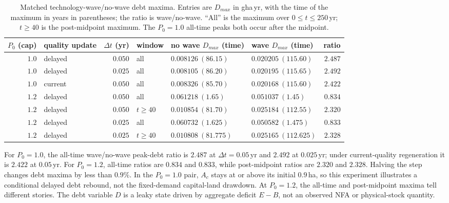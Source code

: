 \documentclass[11pt,a4paper]{article}
\begin{document}
\begin{table}[htbp]
\centering\small
\caption{Matched technology-wave/no-wave debt maxima. Entries are $D_{max}$ in gha\,yr, with the time of the maximum in years in parentheses; the ratio is wave/no-wave. ``All'' is the maximum over $0\le t\le250$\,yr; $t\ge40$ is the post-midpoint maximum. The $P_0=1.0$ all-time peaks both occur after the midpoint.}
\label{tab:si_wave_debt}
\begin{tabularx}{\textwidth}{r l r l >{\centering\arraybackslash}X >{\centering\arraybackslash}X r}
\toprule
$P_0$ (cap) & quality update & $\Delta t$ (yr) & window & no wave $D_{max}$ (time) & wave $D_{max}$ (time) & ratio \\
\midrule
$1.0$ & delayed & $0.050$ & all & $0.008126\ (86.15)$ & $0.020205\ (115.60)$ & $2.487$ \\
$1.0$ & delayed & $0.025$ & all & $0.008105\ (86.20)$ & $0.020195\ (115.65)$ & $2.492$ \\
$1.0$ & current & $0.050$ & all & $0.008326\ (85.70)$ & $0.020168\ (115.60)$ & $2.422$ \\
$1.2$ & delayed & $0.050$ & all & $0.061218\ (1.65)$ & $0.051037\ (1.45)$ & $0.834$ \\
$1.2$ & delayed & $0.050$ & $t\ge40$ & $0.010854\ (81.70)$ & $0.025184\ (112.55)$ & $2.320$ \\
$1.2$ & delayed & $0.025$ & all & $0.060732\ (1.625)$ & $0.050582\ (1.475)$ & $0.833$ \\
$1.2$ & delayed & $0.025$ & $t\ge40$ & $0.010808\ (81.775)$ & $0.025165\ (112.625)$ & $2.328$ \\
\bottomrule
\end{tabularx}
\end{table}

For $P_0=1.0$, the all-time wave/no-wave peak-debt ratio is $2.487$ at $\Delta t=0.05$\,yr and $2.492$ at $0.025$\,yr; under current-quality regeneration it is $2.422$ at $0.05$\,yr. For $P_0=1.2$, all-time ratios are $0.834$ and $0.833$, while post-midpoint ratios are $2.320$ and $2.328$. Halving the step changes debt maxima by less than $0.9\%$. In the $P_0=1.0$ pair, $A_c$ stays at or above its initial $0.9$\,ha, so this experiment illustrates a conditional delayed debt rebound, not the fixed-demand capital-land drawdown. At $P_0=1.2$, the all-time and post-midpoint maxima tell different stories. The debt variable $D$ is a leaky state driven by aggregate deficit $E-B$, not an observed NFA or physical-stock quantity.
\end{document}
